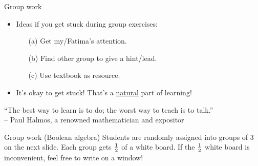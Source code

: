 \documentclass[10pt]{beamer}
\begin{document}
\begin{frame}{Group work}


\begin{myyellowbox}[title=Announcements about group work]
\begin{itemize}
	\item Ideas if you get stuck during group exercises:
	\begin{itemize}
	\item[(a)] Get my/Fatima's attention. 
	\item[(b)] Find other group to give a hint/lead.
	\item[(c)] Use textbook as resource.
	\end{itemize} 
	\item It's okay to get stuck! That's a \underline{natural} part of learning!
\end{itemize}	
\end{myyellowbox}
\vfill 
\begin{mygreenbox}[title=Quote of the Semester]
“The best way to learn is to do; the worst way to teach is to talk.” \\

-- Paul Halmos, a renowned mathematician and expositor
\end{mygreenbox}

\end{frame}


\begin{frame}[standout]

\alert{Group work (Boolean algebra)}
\vfill
Students are randomly assigned into groups of 3 on the next slide.
\vfill 
Each group gets $\frac{1}{2}$ of a white board.
\vfill
If the  $\frac{1}{2}$ white board is inconvenient, feel free to write on a window! 
\end{frame}
\end{document}
